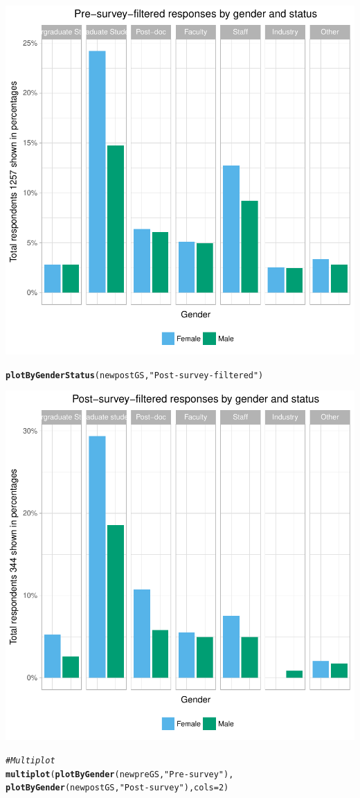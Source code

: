 \documentclass{article}\usepackage[]{graphicx}\usepackage[]{color}
\makeatletter
\newcommand{\hlnum}[1]{\textcolor[rgb]{0.686,0.059,0.569}{#1}}%
\newcommand{\hlstr}[1]{\textcolor[rgb]{0.192,0.494,0.8}{#1}}%
\newcommand{\hlcom}[1]{\textcolor[rgb]{0.678,0.584,0.686}{\textit{#1}}}%
\newcommand{\hlstd}[1]{\textcolor[rgb]{0.345,0.345,0.345}{#1}}%
\newcommand{\hlkwc}[1]{\textcolor[rgb]{0.333,0.667,0.333}{#1}}%
\newcommand{\hlkwd}[1]{\textcolor[rgb]{0.737,0.353,0.396}{\textbf{#1}}}%
\newenvironment{kframe}{%
 \def\at@end@of@kframe{}%
 \ifinner\ifhmode%
  \def\at@end@of@kframe{\end{minipage}}%
  \begin{minipage}{\columnwidth}%
 \fi\fi%
 \def\FrameCommand##1{\hskip\@totalleftmargin \hskip-\fboxsep
 \colorbox{shadecolor}{##1}\hskip-\fboxsep
     \hskip-\linewidth \hskip-\@totalleftmargin \hskip\columnwidth}%
 \MakeFramed {\advance\hsize-\width
   \@totalleftmargin\z@ \linewidth\hsize
   \@setminipage}}%
 {\par\unskip\endMakeFramed%
 \at@end@of@kframe}
\newenvironment{knitrout}{}{} %
\makeatother
\begin{document}
\begin{knitrout}
{\centering \includegraphics[width=.6\linewidth]{figure/calls-Rnwplotting-pre-postsurvey-dataUS-4} 

}


\begin{kframe}\begin{alltt}
\hlkwd{plotByGenderStatus}\hlstd{(newpostGS,} \hlstr{"Post-survey-filtered"}\hlstd{)}
\end{alltt}
\end{kframe}

{\centering \includegraphics[width=.6\linewidth]{figure/calls-Rnwplotting-pre-postsurvey-dataUS-5} 

}


\begin{kframe}\begin{alltt}
\hlcom{# Multiplot}
\hlkwd{multiplot}\hlstd{(}\hlkwd{plotByGender}\hlstd{(newpreGS,} \hlstr{"Pre-survey"}\hlstd{),}
          \hlkwd{plotByGender}\hlstd{(newpostGS,} \hlstr{"Post-survey"}\hlstd{),} \hlkwc{cols}\hlstd{=}\hlnum{2}\hlstd{)}
\end{alltt}
\end{kframe}


\end{knitrout}
\end{document}
